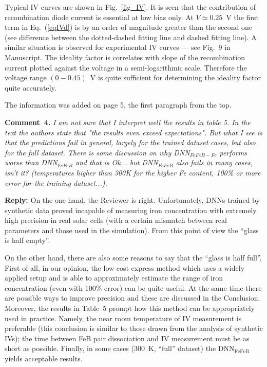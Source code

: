 \documentclass[num-refs]{wiley-article} %
\begin{document}
Typical IV curves are shown in Fig.~\ref{fig_IV}.
It is seen that the contribution of recombination diode current is essential at low bias only.
At $V\simeq 0.25$~V the first term in Eq.~(\ref{eqIVd}) is
by an order of magnitude greater than the second one
(see difference between the dotted-dashed fitting line and dashed fitting line).
A similar situation is observed for
experimental IV curves --- see Fig.~9 in Manuscript.
The ideality factor is correlates with  slope of the recombination current
plotted against the voltage in a semi-logarithmic scale.
Therefore the voltage range $(0-0.45)$~V is quite sufficient for determining the ideality factor quite accurately.



The information was added on page 5, the first paragraph from the top.


\vspace{1cm}
\noindent
\textcolor[rgb]{0.00,0.50,1.00}{\textbf{Comment~4.}}
\emph{I am not sure that I interpret well the results in table 5.
In the text the authors state that "the results even exceed expectations".
But what I see is that the predictions fail in general, largely for the trained dataset cases,
but also for the full dataset.
There is some discussion on why DNN$_{FeFeB-Fe}$ performs worse than DNN$_{FeFeB}$
and that is Ok... but DNN$_{FeFeB}$ also fails in many cases, isn't it?
(temperatures higher than 300K for the higher Fe content,
100\% or more error for the training dataset...).
}

\vspace{0.5cm}
\noindent
\textcolor[rgb]{0.51,0.00,0.00}{\textbf{Reply:}}
On the one hand, the Reviewer is right.
Unfortunately, DNNs  trained by synthetic data 
proved incapable of measuring iron concentration
with extremely high precision in real solar cells
(with a certain mismatch between real parameters and those used in the simulation).
From this point of view the ``glass is half empty''.

On the other hand, there are also some reasons 
to say that the ``glass is half full''.
First of all, in our opinion, 
the low cost express method which uses a widely applied setup and is able 
to approximately estimate the range of iron concentration
(even with 100\% error) can be quite useful. 
At the same time there are possible ways to improve precision  and these are discussed in the Conclusion. 
Moreover, the results in Table~5 prompt how this method can be appropriately used in practice. 
Namely, the near room temperature of IV measurement is preferable 
(this conclusion is similar to those drawn from the analysis of synthetic IVs); 
the time between FeB pair dissociation and IV measurement must be as short as possible. 
Finally, in some cases (300~K, ``full'' dataset) the DNN$_\mathrm{FeFeB}$ yields acceptable results.
\end{document}
